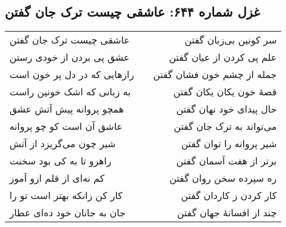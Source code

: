 \begin{center}
\section*{غزل شماره ۶۴۴: عاشقی چیست ترک جان گفتن}
\label{sec:644}
\begin{longtable}{l p{0.5cm} r}
عاشقی چیست ترک جان گفتن
&&
سر کونین بی‌زبان گفتن
\\
عشق پی بردن از خودی رستن
&&
علم پی کردن از عیان گفتن
\\
رازهایی که در دل پر خون است
&&
جمله از چشم خون فشان گفتن
\\
به زبانی که اشک خونین راست
&&
قصهٔ خون یکان یکان گفتن
\\
همچو پروانه پیش آتش عشق
&&
حال پیدای خود نهان گفتن
\\
عاشق آن است کو چو پروانه
&&
می‌تواند به ترک جان گفتن
\\
شیر چون می‌گریزد از آتش
&&
شیر پروانه را توان گفتن
\\
راهرو تا به کی بود سخنت
&&
برتر از هفت آسمان گفتن
\\
کم نه‌ای از قلم ازو آموز
&&
ره سپرده سخن روان گفتن
\\
کار کن زانکه بهتر است تو را
&&
کار کردن ز کاردان گفتن
\\
جان به جانان خود ده‌ای عطار
&&
چند از افسانهٔ جهان گفتن
\\
\end{longtable}
\end{center}
